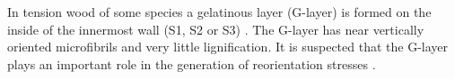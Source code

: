 In tension wood of some species a gelatinous layer (G-layer)
is formed on the inside of the innermost wall (S1, S2 or S3) \citep{gardiner2014biology}. The
G-layer has near vertically oriented microfibrils and very little lignification.
It is suspected that the G-layer plays an important role in the generation of
reorientation stresses \citep{Pilate_2004}.